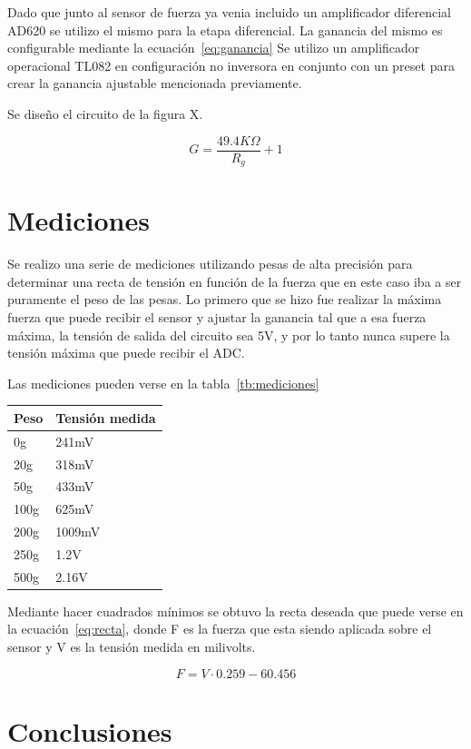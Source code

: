 \documentclass[a4paper, 10pt, spanish]{article}
\begin{document}
    Dado que junto al sensor de fuerza ya venia incluido un amplificador diferencial AD620 se utilizo el mismo para la etapa diferencial. La ganancia del mismo es configurable mediante la ecuación~\ref{eq:ganancia} Se utilizo un amplificador operacional TL082 en configuración no inversora en conjunto con un preset para crear la ganancia ajustable mencionada previamente.
    
    Se diseño el circuito de la figura X.
    
    \begin{equation}\label{eq:ganancia}
        G = \frac{49.4K\Omega}{R_g} + 1
    \end{equation}

\section{Mediciones}

    Se realizo una serie de mediciones utilizando pesas de alta precisión para determinar una recta de tensión en función de la fuerza que en este caso iba a ser puramente el peso de las pesas. Lo primero que se hizo fue realizar la máxima fuerza que puede recibir el sensor y ajustar la ganancia tal que a esa fuerza máxima, la tensión de salida del circuito sea 5V, y por lo tanto nunca supere la tensión máxima que puede recibir el ADC.
    
    Las mediciones pueden verse en la tabla~\ref{tb:mediciones}
    
    \begin{center}
        \begin{tabular}{| l | l |}
        \hline
        Peso & Tensión medida \\ \hline
        0g   & 241mV  \\ \hline
        20g  & 318mV  \\ \hline
        50g  & 433mV  \\ \hline
        100g & 625mV  \\ \hline
        200g & 1009mV \\ \hline
        250g & 1.2V   \\ \hline
        500g & 2.16V  \\ \hline
        \end{tabular}
    \end{center}
    
     Mediante hacer cuadrados mínimos se obtuvo la recta deseada que puede verse en la ecuación~\ref{eq:recta}, donde F es la fuerza que esta siendo aplicada sobre el sensor y V es la tensión medida en milivolts.
     
    \begin{equation}\label{eq:recta}
        F = V\cdot0.259 - 60.456
    \end{equation}
     
     
\section{Conclusiones}
\end{document}
